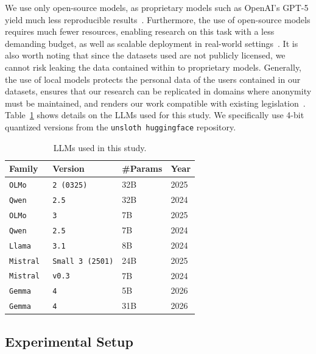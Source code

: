\documentclass[manuscript,screen,review,anonymous]{acmart}
\theoremstyle{acmplain}
\theoremstyle{researchquestionstyle}
\begin{document}
We use only open-source models, as proprietary models such as OpenAI's GPT-5 yield much less reproducible results~\citep{bisbee_2023}. Furthermore, the use of open-source models requires much fewer resources, enabling research on this task with a less demanding budget, as well as scalable deployment in real-world settings~\citep{rossi_2024}. It is also worth noting that since the datasets used are not publicly licensed, we cannot risk leaking the data contained within to proprietary models. Generally, the use of local models protects the personal data of the users contained in our datasets, ensures that our research can be replicated in domains where anonymity must be maintained, and renders our work compatible with existing legislation~\citep{eu_ai_act, GDPR}. Table~\ref{tab:llm-details} shows details on the LLMs used for this study. We specifically use 4-bit quantized versions from the \texttt{unsloth huggingface} repository.

\begin{table}[ht]
	\caption{LLMs used in this study.}
	\label{tab:llm-details}
	\centering
	\begin{tabular}{l l l l}
		\toprule
		\textbf{Family} & \textbf{Version} & \textbf{\#Params} & \textbf{Year} \\
		\midrule
		\texttt{OLMo}~\citep{groeneveld-etal-2024-olmo} & \texttt{2 (0325)} & 32B & 2025 \\
		\texttt{Qwen}~\citep{qwen2025qwen25technicalreport} & \texttt{2.5} & 32B & 2024 \\
		\texttt{OLMo}~\citep{olmo2026olmo3} & \texttt{3} & 7B & 2025 \\
		\texttt{Qwen}~\citep{qwen2025qwen25technicalreport} & \texttt{2.5} & 7B & 2024 \\
		\texttt{Llama}~\citep{grattafiori2024llama3herdmodels} & \texttt{3.1} & 8B & 2024 \\
		\texttt{Mistral}~\citep{jiang2023mistral7b} & \texttt{Small 3 (2501)} & 24B & 2025 \\
		\texttt{Mistral}~\citep{jiang2023mistral7b} & \texttt{v0.3} & 7B & 2024 \\
		\texttt{Gemma}~\citep{gemma4} & \texttt{4} & 5B & 2026 \\
		\texttt{Gemma}~\citep{gemma4} & \texttt{4} & 31B & 2026 \\
		\bottomrule
	\end{tabular}
\end{table}


\subsection{Experimental Setup}
\end{document}
